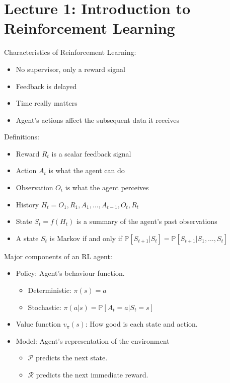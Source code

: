 \section{Lecture 1: Introduction to Reinforcement Learning}

Characteristics of Reinforcement Learning:
\begin{itemize}
    \item No supervisor, only a reward signal
    \item Feedback is delayed
    \item Time really matters
    \item Agent's actions affect the subsequent data it receives
\end{itemize}

\noindent Definitions:

\begin{itemize}
    \item Reward $R_t$ is a scalar feedback signal
    \item Action $A_t$ is what the agent can do
    \item Observation $O_t$ is what the agent perceives
    \item History $H_t = O_1, R_1, A_1, \ldots, A_{t-1}, O_t, R_t$
    \item State $S_t = f(H_t)$ is a summary of the agent's past observations
    \item A state $S_t$ is Markov if and only if $\mathbb{P}[S_{t+1}|S_t] =
              \mathbb{P}[S_{t+1}|S_1, \ldots, S_t]$
\end{itemize}

\noindent Major components of an RL agent:

\begin{itemize}
    \item Policy: Agent's behaviour function.
          \begin{itemize}
              \item Deterministic: $\pi(s) = a$
              \item Stochastic: $\pi(a|s) = \mathbb{P}[A_t = a | S_t = s]$
          \end{itemize}
    \item Value function $v_{\pi}(s)$: How good is each state and action.
    \item Model: Agent's representation of the environment
          \begin{itemize}
              \item $\mathcal{P}$ predicts the next state.
              \item $\mathcal{R}$ predicts the next immediate reward.
          \end{itemize}
\end{itemize}